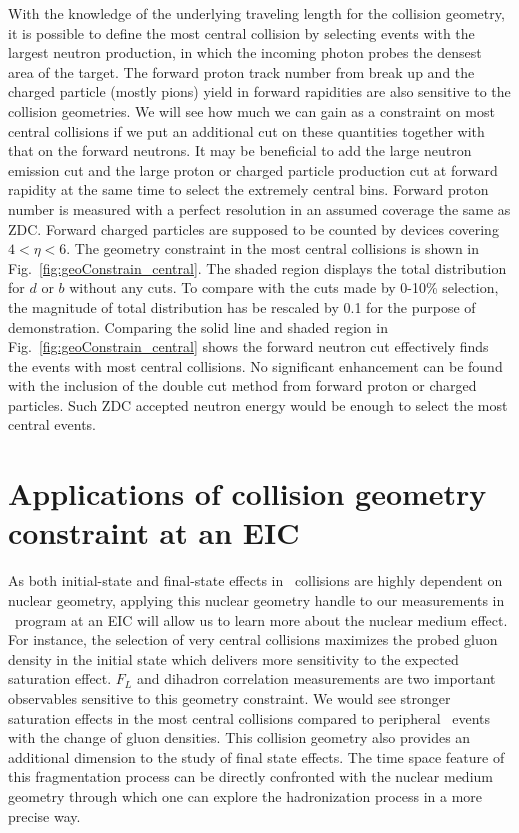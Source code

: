 With the knowledge of the underlying traveling length for the collision geometry,
it is possible to define the most central collision by selecting events with the
largest neutron production, in which the incoming photon probes the densest area
of the target. The forward proton track number from break up and the charged
particle (mostly pions) yield in forward rapidities are also sensitive to the
collision geometries. We will see how much we can gain as a constraint on
most central collisions if we put an additional cut on these quantities together
with that on the forward neutrons. It may be beneficial to add the large neutron emission cut
and the large proton or charged particle production cut at forward rapidity at
the same time to select the extremely central bins. Forward proton number is
measured with a perfect resolution in an assumed coverage the same as ZDC.
Forward charged particles are supposed to be counted by devices covering
$4<\eta<6$. The geometry constraint in the most central collisions is
shown in Fig.~\ref{fig:geoConstrain_central}. The shaded region displays the total
distribution for $d$ or $b$ without any cuts. To compare with the cuts made by
0-10\% selection, the magnitude of total distribution has be rescaled by 0.1 for the purpose of
demonstration. Comparing the solid line and shaded region in
Fig.~\ref{fig:geoConstrain_central} shows the forward neutron cut effectively finds
the events with most central collisions. No significant enhancement can be found
with the inclusion of the double cut method from forward proton or charged
particles. Such ZDC accepted neutron energy would be enough to select
the most central events.



\section{Applications of collision geometry constraint at an EIC}\label{sec:application}

As both initial-state and final-state effects in \eA\ collisions are highly dependent
on nuclear geometry, applying this nuclear geometry handle to our
measurements in \eA\ program at an EIC will allow us to learn more
about the nuclear medium effect. For instance, the selection of very
central collisions maximizes the probed gluon density in the initial state which
delivers more sensitivity to the expected saturation effect. $F_{L}$ and dihadron
correlation measurements are two important observables sensitive to this
geometry constraint. We would see stronger saturation effects in the most
central collisions compared to peripheral \eA\ events with the change of
gluon densities. This collision geometry also provides an additional dimension to
the study of final state effects. The time space feature of this fragmentation
process can be directly confronted with the nuclear medium geometry through
which one can explore the hadronization process in a more precise way.


